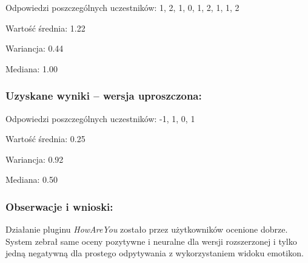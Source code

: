 	Odpowiedzi poszczególnych uczestników: 1, 2, 1, 0, 1, 2, 1, 1, 2
	
	Wartość średnia: 1.22
	
	Wariancja: 0.44
	
	Mediana: 1.00
	
	\subsubsection{Uzyskane wyniki -- wersja uproszczona:}
	
	Odpowiedzi poszczególnych uczestników: -1, 1, 0, 1
	
	Wartość średnia: 0.25
	
	Wariancja: 0.92
	
	Mediana: 0.50
	
	\subsubsection{Obserwacje i wnioski:}
	
	Działanie pluginu \textit{HowAreYou} zostało przez użytkowników ocenione dobrze. System zebrał same oceny pozytywne i neuralne dla wersji rozszerzonej i tylko jedną negatywną dla prostego odpytywania z wykorzystaniem widoku emotikon.
	
	